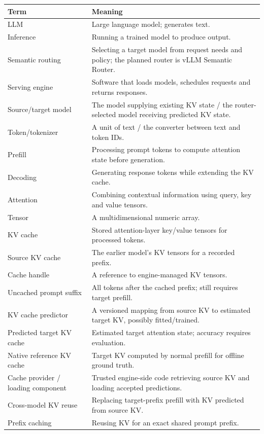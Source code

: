 \documentclass[12pt]{article}
\begin{document}
\begin{longtable}{@{}p{}p{}@{}}
\toprule Term & Meaning\\\midrule\endhead
LLM & Large language model; generates text.\\
Inference & Running a trained model to produce output.\\
Semantic routing & Selecting a target model from request needs and policy; the planned router is vLLM Semantic Router.\\
Serving engine & Software that loads models, schedules requests and returns responses.\\
Source/target model & The model supplying existing KV state / the router-selected model receiving predicted KV state.\\
Token/tokenizer & A unit of text / the converter between text and token IDs.\\
Prefill & Processing prompt tokens to compute attention state before generation.\\
Decoding & Generating response tokens while extending the KV cache.\\
Attention & Combining contextual information using query, key and value tensors.\\
Tensor & A multidimensional numeric array.\\
KV cache & Stored attention-layer key/value tensors for processed tokens.\\
Source KV cache & The earlier model's KV tensors for a recorded prefix.\\
Cache handle & A reference to engine-managed KV tensors.\\
Uncached prompt suffix & All tokens after the cached prefix; still requires target prefill.\\
KV cache predictor & A versioned mapping from source KV to estimated target KV, possibly fitted/trained.\\
Predicted target KV cache & Estimated target attention state; accuracy requires evaluation.\\
Native reference KV cache & Target KV computed by normal prefill for offline ground truth.\\
Cache provider / loading component & Trusted engine-side code retrieving source KV and loading accepted predictions.\\
Cross-model KV reuse & Replacing target-prefix prefill with KV predicted from source KV.\\
Prefix caching & Reusing KV for an exact shared prompt prefix.\\

\end{longtable}
\end{document}

